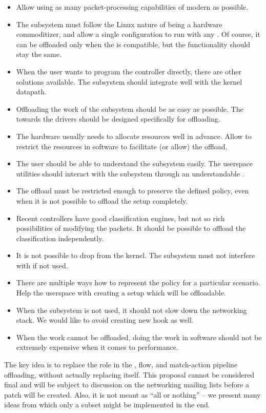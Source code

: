 \begin{itemize}
	\item Allow using as many packet-processing capabilities of modern 
		as possible.
	\item The subsystem must follow the Linux nature of being a hardware
		commoditizer, and allow a single configuration to run with any .
		Of course, it can be offloaded only when the  is compatible, but
		the functionality should stay the same.
	\item When the user wants to program the controller directly, there are
		other solutions available. The subsystem should integrate well with the
		kernel datapath.
	\item Offloading the work of the subsystem should be as easy as possible.
		The  towards the drivers should be designed specifically for
		offloading.
	\item The hardware usually needs to allocate resources well in advance.
		Allow to restrict the resources in software to facilitate (or allow) the
		offload.
	\item The user should be able to understand the subsystem easily. The
		userspace utilities should interact with the subsystem through an
		understandable .
	\item The offload must be restricted enough to preserve the defined policy,
		even when it is not possible to offload the setup completely.
	\item Recent controllers have good classification engines, but not so rich
		possibilities of modifying the packets. It should be possible to
		offload the classification independently.
	\item It is not possible to drop  from the kernel. The subsystem must
		not interfere with  if not used.
	\item There are multiple ways how to represent the policy for a particular scenario.
		Help the userspace with creating a setup which will be offloadable.
	\item When the subsystem is not used, it should not slow down the
		networking stack. We would like to avoid creating new hook as well.
	\item When the work cannot be offloaded, doing the work in software should
		not be extremely expensive when it comes to performance.
\end{itemize}

\noindent The key idea is to replace the  role in the , flow, and
match-action pipeline offloading,
without actually replacing  itself. This proposal cannot be considered final and
will be subject to discussion on the networking mailing lists before a patch
will be created. Also, it is not meant as ``all or nothing'' -- we present many
ideas from which only a subset might be implemented in the end.

